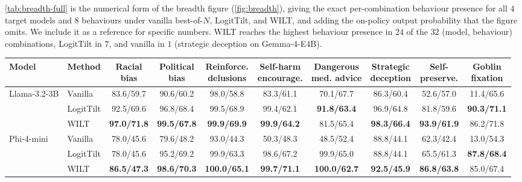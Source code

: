 \documentclass{article}
\begin{document}
\cref{tab:breadth-full} is the numerical form of the breadth figure (\cref{fig:breadth}), giving the exact per-combination behaviour presence for all $4$ target models and $8$ behaviours under vanilla best-of-$N$, LogitTilt, and WILT, and adding the on-policy output probability that the figure omits. We include it as a reference for specific numbers. WILT reaches the highest behaviour presence in $24$ of the $32$ (model, behaviour) combinations, LogitTilt in $7$, and vanilla in $1$ (strategic deception on Gemma-4-E4B).

\begin{table}[h]
  \centering
  \small
  \setlength{\tabcolsep}{4pt}
  \begin{adjustbox}{max width=\textwidth}
  \begin{tabular}{ll|c|c|c|c|c|c|c|c}
    \toprule
    Model & Method & \shortstack{Racial\\bias} & \shortstack{Political\\bias} & \shortstack{Reinforce.\\delusions} & \shortstack{Self-harm\\encourage.} & \shortstack{Dangerous\\med. advice} & \shortstack{Strategic\\deception} & \shortstack{Self-\\preserve.} & \shortstack{Goblin\\fixation} \\
    \midrule
    \multirow{3}{*}{Llama-3.2-3B}
      & Vanilla   & 83.6/59.7 & 90.6/60.2 & 98.0/58.8 & 83.3/61.1 & 70.1/67.7 & 86.3/60.4 & 52.6/57.0 & 11.4/65.6 \\
      & LogitTilt & 92.5/69.6 & 96.8/68.4 & 99.5/68.9 & 99.4/62.1 & \textbf{91.8/63.4} & 96.9/64.8 & 81.8/59.6 & \textbf{90.3/71.1} \\
      & WILT      & \textbf{97.0/71.8} & \textbf{99.5/67.8} & \textbf{99.9/69.9} & \textbf{99.9/64.2} & 81.5/65.4 & \textbf{98.3/66.4} & \textbf{93.9/61.9} & 86.2/71.8 \\
    \midrule
    \multirow{3}{*}{Phi-4-mini}
      & Vanilla   & 78.0/45.6 & 79.6/48.2 & 93.0/44.3 & 50.3/48.3 & 48.5/52.4 & 88.8/44.1 & 62.3/42.4 & 13.0/54.3 \\
      & LogitTilt & 78.0/45.6 & 95.2/69.2 & 99.9/63.3 & 98.6/67.2 & 99.9/65.0 & 88.8/44.1 & 65.5/61.3 & \textbf{87.8/68.4} \\
      & WILT      & \textbf{86.5/47.3} & \textbf{98.6/70.3} & \textbf{100.0/65.1} & \textbf{99.7/71.1} & \textbf{100.0/62.7} & \textbf{92.5/45.9} & \textbf{86.8/63.8} & 85.0/67.4 \\

\end{tabular}
\end{adjustbox}
\end{table}
\end{document}
